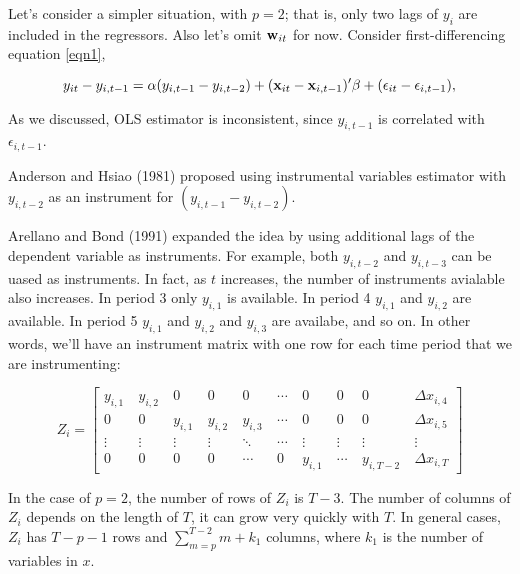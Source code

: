 Let's consider a simpler situation, with $p=2$; that is, only two lags of $y_i$ are included in the regressors. Also let's omit ${\bf w}_{it}$ for now.   Consider first-differencing equation \ref{eqn1}, 

\begin{equation}
y_{it} - y_{i,t-1}= \alpha ( y_{i, t-1} - y_{i, t-2}) + ({\bf x}_{it} - {\bf x}_{i, t-1})' \beta +  (\epsilon_{it} - \epsilon_{i,t-1}), 
\end{equation}

As we discussed, OLS estimator is inconsistent, since $y_{i, t-1}$ is correlated with $\epsilon_{i, t-1}$.

Anderson and Hsiao (1981) proposed using instrumental variables estimator with $y_{i,t-2}$ as an instrument for $( y_{i, t-1} - y_{i, t-2}) $.  

Arellano and Bond (1991) expanded the idea by using additional lags of the dependent variable as instruments.  For example, both $y_{i,t-2}$ and $y_{i,t-3}$ can be uased as instruments.  In fact, as $t$ increases, the number of instruments avialable also increases.  In period 3 only $y_{i,1}$ is available.  In period 4 $y_{i,1}$ and $y_{i,2}$ are available.  In period 5  $y_{i,1}$ and $y_{i,2}$ and  $y_{i,3}$ are availabe, and so on.  In other words, we'll have an instrument matrix with one row for each time period that we are instrumenting:



\begin{equation}
Z_i = 
\begin{bmatrix}
y_{i,1} & \ y_{i,2} & \ 0 & \  0 & \ 0 & \ \cdots & \ 0 & \  0 & \ 0 & \ \Delta x_{i,4} \\ 0 & \  0 & \ y_{i,1} & \ y_{i,2} & \ y_{i,3}  & \ \cdots & \ 0 & \  0 & \ 0 & \ \Delta x_{i,5} \\ \vdots & \  \vdots & \  \vdots & \  \vdots & \  \ddots  & \ \cdots & \ \vdots & \  \vdots & \ \vdots & \  \vdots \\ 0 & \  0 & \ 0 & \ 0 & \ \cdots  & \ 0 & \ y_{i,1} & \  \cdots & \ y_{i,T-2} & \ \Delta x_{i,T} 
\end{bmatrix}
\end{equation}

In the case of $p=2$, the number of rows of $Z_i$ is $T-3$. The number of columns of $Z_i$ depends on the length of $T$, it can grow very quickly with $T$.  In general cases, $Z_i$ has $T-p-1$ rows and $\sum_{m=p}^{T-2}m+k_1 $ columns, where $k_1$ is the number of variables in $x$.


